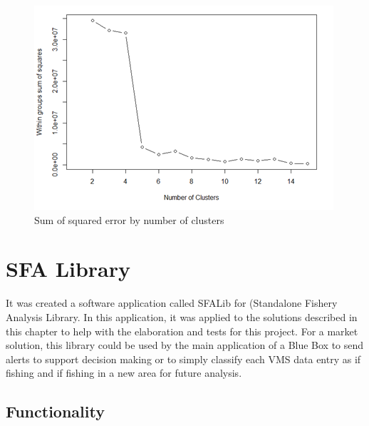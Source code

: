 \begin{figure}[H]
    \centering
    \includegraphics[width=0.8\linewidth]{Chapters/img/elbow_method.png}
    \caption{Sum of squared error by number of clusters}
    \label{fig:elbow_method}
\end{figure}






\section{SFA Library} %
\label{sub:sfa_library}

It was created a software application called SFALib for (Standalone Fishery Analysis Library. In this application, it was applied to the solutions described in this chapter to help with the elaboration and tests for this project. For a market solution, this library could be used by the main application of a Blue Box to send alerts to support decision making or to simply classify each VMS data entry as if fishing and if fishing in a new area for future analysis.



\subsection{Functionality} %
\label{sub:functionality}

